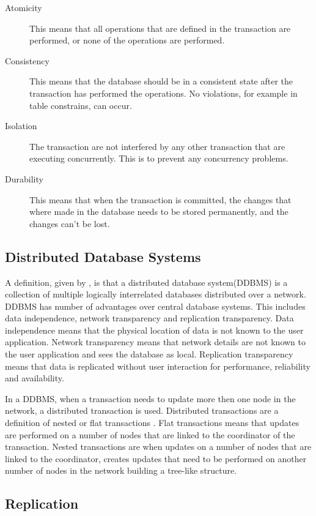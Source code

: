 \begin{description}
	\item[Atomicity] This means that all operations that are defined in the transaction are performed, or none of the operations are performed.
	\item[Consistency] This means that the database should be in a consistent state after the transaction has performed the operations. No violations, for example in table constrains, can occur. 
	\item[Isolation] The transaction are not interfered by any  other transaction that are executing concurrently. This is to prevent any concurrency problems.
	\item[Durability] This means that when the transaction is committed, the changes that where made in the database needs to be stored permanently, and the changes can't be lost. 
\end{description}


\subsection{Distributed Database Systems} %
\label{sec:distributed_database_systems}

A definition, given by \cite{prins99}, is that a distributed database system(DDBMS) is a collection of multiple logically interrelated databases distributed over a network. DDBMS has number of advantages over central database systems. This includes data independence, network transparency and replication transparency. Data independence means that the physical location of data is not known to the user application. Network transparency means that network details are not known to the user application and sees the database as local. Replication transparency means that data is replicated without user interaction for performance, reliability and availability.

In a DDBMS, when a transaction needs to update more then one node in the network, a distributed transaction is used. Distributed transactions are a definition of nested or flat transactions \cite[]{Coulouris2005dsc}. Flat transactions means that updates are performed on a number of nodes that are linked to the coordinator of the transaction. Nested transactions are when updates on a number of nodes that are linked to the coordinator, creates updates that need to be performed on another number of nodes in the network building a tree-like structure. 

\subsection{Replication} 
\label{ssub:replication}

